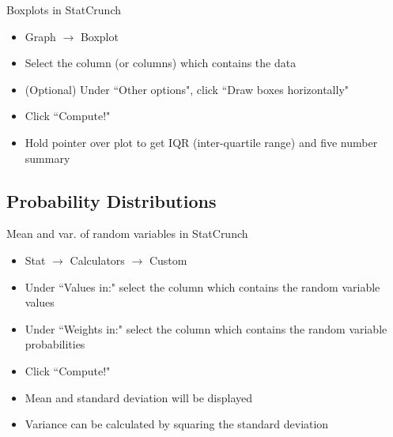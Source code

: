 \documentclass[aspectratio=169]{beamer}
\begin{document}
\begin{frame}{Boxplots in StatCrunch}
\begin{block}{}
\begin{itemize}
\item Graph $\to$ Boxplot
\item Select the column (or columns) which contains the data
\item (Optional) Under ``Other options", click ``Draw boxes horizontally"
\item Click ``Compute!"
\item Hold pointer over plot to get IQR (inter-quartile range) and five number summary
\end{itemize}
\end{block}

\end{frame}


% 
%
\subsection{Probability Distributions}


\begin{frame}{Mean and var. of random variables in StatCrunch}
\begin{block}{}
\begin{itemize}
\item Stat $\to$ Calculators $\to$ Custom
\item Under ``Values in:" select the column which contains the random variable values
\item Under ``Weights in:" select the column which contains the random variable probabilities
\item Click ``Compute!"
\item Mean and standard deviation will be displayed
\item Variance can be calculated by squaring the standard deviation
\end{itemize}
\end{block}
\end{frame}
\end{document}
